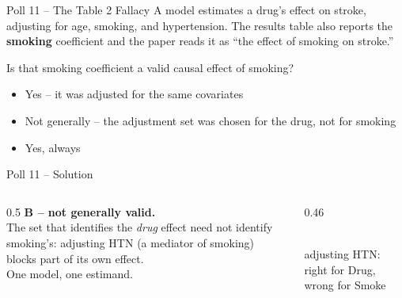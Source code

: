 \documentclass[aspectratio=169]{beamer}
\begin{document}
\begin{frame}{Poll 11 \;--\; The Table 2 Fallacy}
  \small
  A model estimates a drug's effect on stroke, adjusting for age, smoking, and
  hypertension. The results table also reports the \textbf{smoking} coefficient
  and the paper reads it as ``the effect of smoking on stroke.''
  \vspace{0.8em}

  Is that smoking coefficient a valid causal effect of smoking?
  \begin{itemize}
    \item[\textbf{A.}] Yes -- it was adjusted for the same covariates
    \item[\textbf{B.}] Not generally -- the adjustment set was chosen for the drug, not for smoking
    \item[\textbf{C.}] Yes, always
  \end{itemize}
\end{frame}

\begin{frame}{Poll 11 \;--\; Solution}
  \small
  \begin{columns}[T]
    \begin{column}{0.5\textwidth}
      \textcolor{good}{\textbf{B -- not generally valid.}}\\[0.4em]
      The set that identifies the \emph{drug} effect need not identify
      smoking's: adjusting HTN (a mediator of smoking) blocks part of its own
      effect.\\[0.2em]
      One model, one estimand.
    \end{column}
    \begin{column}{0.46\textwidth}
      \centering
      \\[0.2em]
      {\scriptsize adjusting HTN: right for Drug, wrong for Smoke}
    \end{column}
  \end{columns}
\end{frame}
\end{document}
